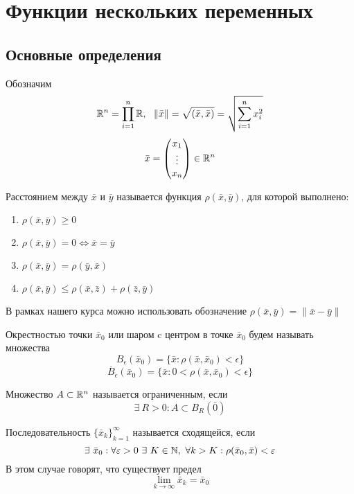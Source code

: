 \newpage
\section{Функции нескольких переменных}
\subsection{Основные определения}
Обозначим
\[\R^n=\prod\limits_{i=1}^{n}\R,\ \ \|\bar{x}\|=\sqrt{(\bar{x},\bar{x})}=\sqrt{\sum\limits_{i=1}^{n}x_i^2}\]
\[\bar{x}=\begin{pmatrix}
    x_1\\
    \vdots\\
    x_n
\end{pmatrix}\in \mathbb{R}^n\]
\begin{definition}
    Расстоянием между $\bar{x}$ и $\bar{y}$ называется функция $\rho(\bar{x}, \bar{y})$, для которой выполнено:
    \begin{enumerate}
        \item $\rho(\bar{x}, \bar{y})\geq 0$
        \item $\rho(\bar{x}, \bar{y})=0 \Leftrightarrow \bar{x}=\bar{y}$
        \item $\rho(\bar{x}, \bar{y})=\rho(\bar{y}, \bar{x})$
        \item $\rho(\bar{x}, \bar{y})\leq \rho(\bar{x}, \bar{z})+\rho(\bar{z}, \bar{y})$
    \end{enumerate}
    В рамках нашего курса можно использовать обозначение $\rho(\bar{x}, \bar{y})=\|\bar{x}-\bar{y}\|$
\end{definition} 
\begin{definition} Окрестностью точки $\bar{x}_0$ или шаром c центром в точке $\bar{x}_0$ будем называть множества
    \[B_{\epsilon}(\bar{x}_0)=\{\bar{x}: \rho(\bar{x}, \bar{x}_0)<\epsilon\}\]
    \[\mathring{B_{\epsilon}}(\bar{x}_0)=\{\bar{x}: 0<\rho(\bar{x}, \bar{x}_0)<\epsilon\}\]
\end{definition}
\begin{definition}
    Множество $A\subset \mathbb{R}^n$ называется ограниченным, если 
    \[\exists\ R>0: A\subset B_{R}(\bar{0})\]
\end{definition}
\begin{definition}
    Последовательность $\{\bar{x}_k\}_{k=1}^{\infty}$ называется сходящейся, если 
    \[\exists\ \bar{x}_0: \forall \epsilon>0\ \exists\ K\in \N,\ \forall k>K: \rho(\bar{x}_0, \bar{x})<\epsilon\]
    В этом случае говорят, что существует предел
    \[\lim\limits_{k\to \infty}\bar{x}_k=\bar{x}_0\]
\end{definition} 
